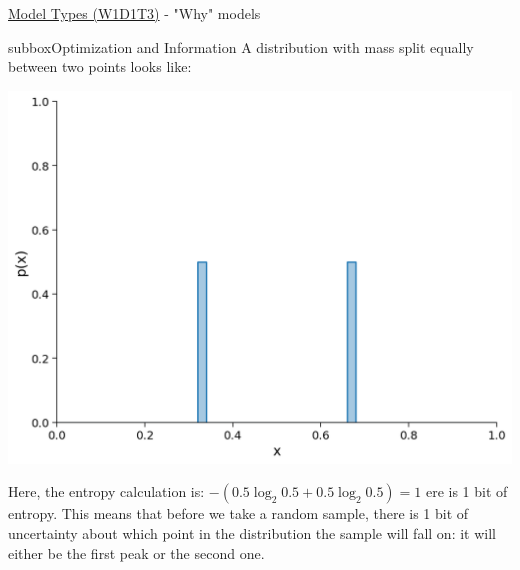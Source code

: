 \begin{textbox}{\href{https://compneuro.neuromatch.io/tutorials/W1D1_ModelTypes/student/W1D1_Tutorial3.html}{Model Types (W1D1T3)} -  "Why" models}
\begin{subbox}{subbox}{Optimization and Information}
A distribution with mass split equally between two points looks like:

\begin{center}
    
\includegraphics[scale=0.2]{Figures/MT/MT_Figure7.png}
\end{center}

Here, the entropy calculation is: $-(0.5 \log_2 0.5 + 0.5\log_2 0.5)=1$
ere is 1 bit of entropy. This means that before we take a random sample, there is 1 bit of uncertainty about which point in the distribution the sample will fall on: it will either be the first peak or the second one. 

\end{subbox}
\end{textbox}
